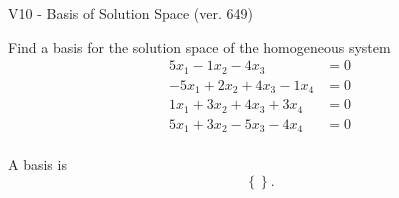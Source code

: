 \begin{exercise}
  \begin{exerciseTitle}V10 - Basis of Solution Space (ver. 649)\end{exerciseTitle}
  \begin{exerciseStatement}
    Find a basis for the solution space of the homogeneous system 
\begin{align*}
 5 x_ 1 -1 x_ 2 -4 x_ 3 &= 0  \\ 
  -5 x_ 1 + 2 x_ 2 + 4 x_ 3 -1 x_ 4 &= 0  \\ 
  1 x_ 1 + 3 x_ 2 + 4 x_ 3 + 3 x_ 4 &= 0  \\ 
  5 x_ 1 + 3 x_ 2 -5 x_ 3 -4 x_ 4 &= 0  \\ 
 \end{align*}


 
  \end{exerciseStatement}

  \begin{exerciseAnswer}
   A basis is   
\[\left\{\right\}.\]

  


  \end{exerciseAnswer}
\end{exercise}